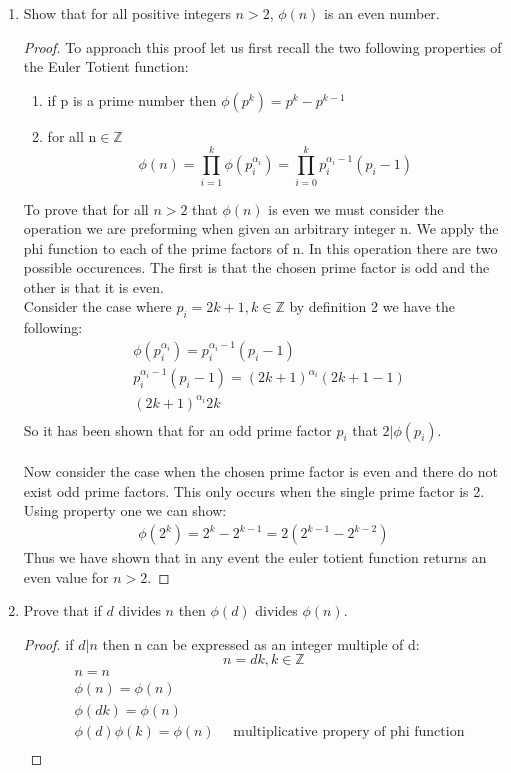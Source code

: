 \documentclass[11pt]{article}
\theoremstyle{definition}  %
\newcommand{\Z}{\mathbb{Z}}
\begin{document}
\begin{enumerate}
\begin{proof}
This means that d=gcd(b,r) and d=gcd(a,b) by definition so we arrive to the final conclusion that:
\[
  gcd(b,r)=gcd(a,b)
\]
\end{proof}
\item Show that for all positive integers $n > 2$, $\phi(n)$ is an even number.
\begin{proof}
To approach this proof let us first recall the two following properties of the Euler Totient function:
\begin{enumerate}
  \item if p is a prime number then $\phi(p^k)=p^k-p^{k-1}$
  \item for all n$\in \Z$\[
  \phi(n)=\prod_{i=1}^k\phi(p_i^{\alpha_i})=\prod_{i=0}^kp_i^{\alpha_i-1}(p_i-1)
\]
\end{enumerate}
To prove that for all $n >2$ that $\phi(n)$ is even we must consider the operation we are preforming when given an arbitrary integer n. We apply the phi function to each of the prime factors of n. In this operation there are two possible occurences. The first is that the chosen prime factor is odd and the other is that it is even. \\
Consider the case where $p_i=2k+1, k\in \Z$ by definition 2 we have the following:
\begin{align*}
  &\phi(p_i^{\alpha_i})=p_i^{\alpha_i-1}(p_i-1)\\
  &p_i^{\alpha_i-1}(p_i-1)=(2k+1)^{\alpha_i}(2k+1-1)\\
  &(2k+1)^{\alpha_i}2k\\
\end{align*}
So it has been shown that for an odd prime factor $p_i$ that $2|\phi(p_i)$.\\\\
Now consider the case when the chosen prime factor is even and there do not exist odd prime factors. This only occurs when the single prime factor is 2. Using property one we can show: \begin{align*}
  \phi(2^k)=2^k-2^{k-1}=2(2^{k-1}-2^{k-2})
\end{align*}
Thus we have shown that in any event the euler totient function returns an even value for $n> 2$.
\end{proof}

\item Prove that if $d$ divides $n$ then $\phi(d)$ divides $\phi(n)$.
\begin{proof}
if $d|n$ then n can be expressed as an integer multiple of d:
\[
  n=dk,k\in \Z
\]
\begin{align*}
  &n=n\\
  &\phi(n)=\phi(n)\\
  &\phi(dk)=\phi(n)\\
    &\phi(d)\phi(k)=\phi(n)\quad \text{ multiplicative propery of phi function}\\
\end{align*}


\end{proof}
\end{enumerate}
\end{document}
